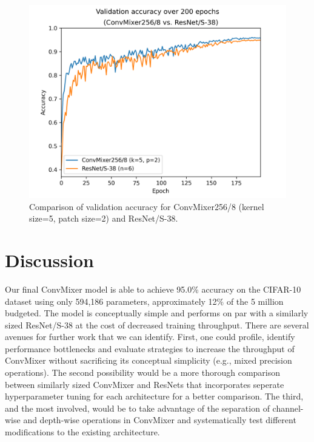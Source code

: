 \documentclass[letterpaper]{article} %
\begin{document}
  \begin{figure}
    \includegraphics[width=\linewidth]{final_validation.png}
    \caption{Comparison of validation accuracy for ConvMixer256/8 (kernel size=5, patch size=2) and ResNet/S-38.}
  \end{figure}

\section{Discussion}

Our final ConvMixer model is able to achieve 95.0\% accuracy on the CIFAR-10 dataset using only 594,186 parameters, approximately 12\% of the 5 million budgeted. The model is conceptually simple and performs on par with a similarly sized ResNet/S-38 at the cost of decreased training throughput. There are several avenues for further work that we can identify. First, one could profile, identify performance bottlenecks and evaluate strategies to increase the throughput of ConvMixer without sacrificing its conceptual simplicity (e.g., mixed precision operations). The second possibility would be a more thorough comparison between similarly sized ConvMixer and ResNets that incorporates seperate hyperparameter tuning for each architecture for a better comparison. The third, and the most involved, would be to take advantage of the separation of channel-wise and depth-wise operations in ConvMixer and systematically test different modifications to the existing architecture.

\appendix


\end{document}
